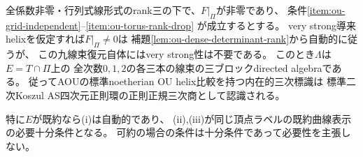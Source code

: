 \begin{theorem}[rank三の被約切断からの九線束の復元]
\label{thm:ou-reduced-determinant-grid}
全係数非零・行列式線形式のrank三の下で、$F|_\Pi$が非零であり、
条件\ref{item:ou-grid-independent}--\ref{item:ou-torus-rank-drop}
が成立するとする。
very strong導来helixを仮定すれば$F|_\Pi\ne0$は
補題\ref{lem:ou-dense-determinant-rank}から自動的に従うが、
この九線束復元自体にはvery strong性は不要である。
このとき$\Lambda$は$E=T\cap\Pi$上の
全次数$0,1,2$の各三本の線束の三ブロックdirected algebraである。
従ってAOUの標準noetherian OU helix比較を持つ内在的三次標識は
標準二次Koszul AS四次元正則環の正則正規三次商として認識される。

特に$E$が既約なら(i)は自動的であり、
(ii),(iii)が同じ頂点ラベルの既約曲線表示の必要十分条件となる。
可約の場合の条件は十分条件であって必要性を主張しない。
\end{theorem}
